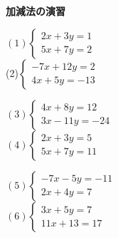\documentclass[b4paper,16.5pt,paparesize, landscape]{ltjsarticle}%
\begin{document}
{\textbf{\Large{加減法の演習}}}\hspace{\fill}{\scalebox{1.5}{（　）組（　　　　　　　　）}}\\
\begin{multicols*}{3}
$(1)\begin{cases}
	2x + 3y = 1 \\
	5 x + 7y = 2
\end{cases}$ 	\\[82mm]
(2)$\begin{cases}
	-7x + 12y = 2\\
	4x + 5y = -13
\end{cases}$\vfill\null\columnbreak

$(3)\begin{cases}
	4x + 8y = 12\\
	3x - 11y = -24
\end{cases}$ 	\\[82mm]

$(4)\begin{cases}
	2x + 3y = 5\\
	5x + 7y = 11
\end{cases}$
 \vfill\null\columnbreak

$(5)\begin{cases}
	-7x - 5y = -11\\
	2x + 4y = 7
\end{cases}$ 	\\[82mm]

$(6)\begin{cases}
	3x + 5y = 7\\
	11x + 13 = 17
\end{cases}$



\end{multicols*}
\end{document}
